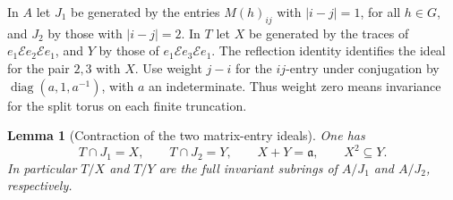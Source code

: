 \documentclass[a4paper,11pt]{article}
\newtheorem{lemma}[proposition]{Lemma}
\theoremstyle{definition}
\theoremstyle{remark}
\numberwithin{equation}{section}
\begin{document}
In \(A\) let \(J_1\) be generated by the entries \(M(h)_{ij}\)
with \(|i-j|=1\), for all \(h\in G\), and \(J_2\) by those with
\(|i-j|=2\). In \(T\) let \(X\) be generated by the traces of
\(e_1\mathcal E e_2\mathcal E e_1\), and \(Y\) by those of
\(e_1\mathcal E e_3\mathcal E e_1\). The reflection identity
identifies the ideal for the pair \(2,3\) with \(X\).
Use weight \(j-i\) for the \(ij\)-entry under conjugation by
\(\operatorname{diag}(a,1,a^{-1})\), with \(a\) an indeterminate.
Thus weight zero means invariance for the split torus on each
finite truncation.

\begin{lemma}[Contraction of the two matrix-entry ideals]
\label{lem:pairedcorners381}
One has
\[
 T\cap J_1=X,\qquad T\cap J_2=Y,\qquad
 X+Y=\mathfrak a,\qquad X^2\subseteq Y .
\]
In particular \(T/X\) and \(T/Y\) are the full invariant
subrings of \(A/J_1\) and \(A/J_2\), respectively.
\end{lemma}
\end{document}
